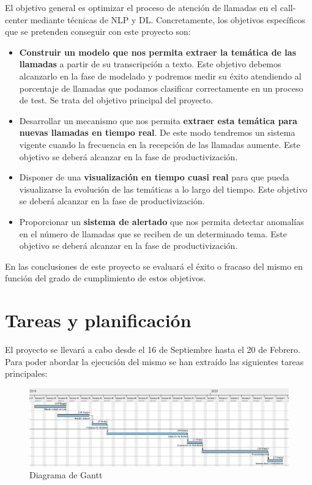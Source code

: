 El objetivo general es optimizar el proceso de atención de llamadas en el call-center mediante técnicas de NLP y DL. Concretamente, los objetivos específicos que se pretenden conseguir con este proyecto son: 

\begin{itemize}
	\item \textbf{Construir un modelo que nos permita extraer la temática de las llamadas} a partir de su transcripción a texto. Este objetivo debemos alcanzarlo en la fase de modelado y podremos medir su éxito atendiendo al porcentaje de llamadas que podamos clasificar correctamente en un proceso de test. Se trata del objetivo principal del proyecto.
	\item Desarrollar un mecanismo que nos permita \textbf{extraer esta temática para nuevas llamadas en tiempo real}. De este modo tendremos un sistema vigente cuando la frecuencia en la recepción de las llamadas aumente. Este objetivo se deberá alcanzar en la fase de productivización. 
	\item Disponer de una\textbf{ visualización en tiempo cuasi real} para que pueda visualizarse la evolución de las temáticas a lo largo del tiempo. Este objetivo se deberá alcanzar en la fase de productivización. 
	\item Proporcionar un \textbf{sistema de alertado} que nos permita detectar anomalías en el número de llamadas que se reciben de un determinado tema. Este objetivo se deberá alcanzar en la fase de productivización.
\end{itemize}

En las conclusiones de este proyecto se evaluará el éxito o fracaso del mismo en función del grado de cumplimiento de estos objetivos.

\section{Tareas y planificación}
\label{section:intro:planificacion}
El proyecto se llevará a cabo desde el 16 de Septiembre hasta el 20 de Febrero. Para poder abordar la ejecución del  mismo se han extraído las siguientes tareas principales: 


\begin{figure}[!ht]
	\centering
	\includegraphics[width=\textwidth]{images/intro/gantt}
	\caption{Diagrama de Gantt}
	\label{fig:gantt}
\end{figure}


